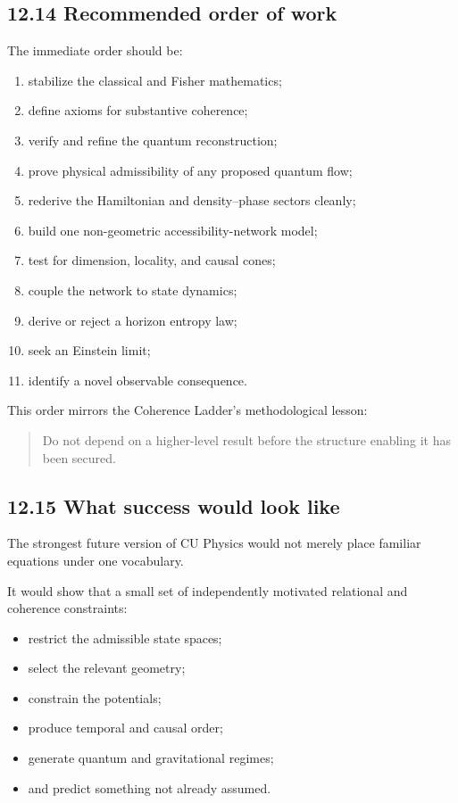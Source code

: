 \documentclass[
  11pt,
]{article}
\providecommand{\tightlist}{%
  \setlength{\itemsep}{0pt}\setlength{\parskip}{0pt}}
\begin{document}
\subsection{12.14 Recommended order of
work}\label{recommended-order-of-work}

The immediate order should be:

\begin{enumerate}
\def\labelenumi{\arabic{enumi}.}
\tightlist
\item
  stabilize the classical and Fisher mathematics;
\item
  define axioms for substantive coherence;
\item
  verify and refine the quantum reconstruction;
\item
  prove physical admissibility of any proposed quantum flow;
\item
  rederive the Hamiltonian and density--phase sectors cleanly;
\item
  build one non-geometric accessibility-network model;
\item
  test for dimension, locality, and causal cones;
\item
  couple the network to state dynamics;
\item
  derive or reject a horizon entropy law;
\item
  seek an Einstein limit;
\item
  identify a novel observable consequence.
\end{enumerate}

This order mirrors the Coherence Ladder's methodological lesson:

\begin{quote}
Do not depend on a higher-level result before the structure enabling it
has been secured.
\end{quote}

\subsection{12.15 What success would look
like}\label{what-success-would-look-like}

The strongest future version of CU Physics would not merely place
familiar equations under one vocabulary.

It would show that a small set of independently motivated relational and
coherence constraints:

\begin{itemize}
\tightlist
\item
  restrict the admissible state spaces;
\item
  select the relevant geometry;
\item
  constrain the potentials;
\item
  produce temporal and causal order;
\item
  generate quantum and gravitational regimes;
\item
  and predict something not already assumed.
\end{itemize}
\end{document}

